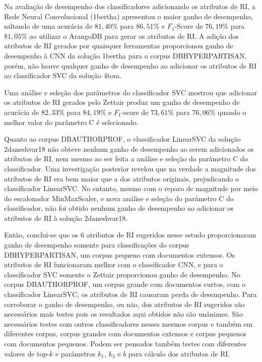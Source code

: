Na avaliação de desempenho dos classificadores adicionando os atributos de RI, a Rede Neural Convolucional (1\underscore{}bertha) apresentou o maior ganho de desempenho, saltando de uma acurácia de $81,40\%$ para $86,51\%$ e $F_1$-Score de $76,19\%$ para $81,05\%$ ao utilizar o ArangoDB para gerar os atributos de RI.
A adição dos atributos de RI gerados por quaisquer ferramentas proporcionou ganho de desempenho à CNN da solução 1\underscore{}bertha para o corpus DB\underscore{}HYPERPARTISAN, porém, não houve qualquer ganho de desempenho ao adicionar os atributos de RI ao classificador SVC da solução 4\underscore{}tom.

Uma análise e seleção dos parâmetros do classificador SVC mostrou que adicionar os atributos de RI gerados pelo Zettair produz um ganho de desempenho de acurácia de $82,33\%$ para $84,19\%$ e $F_1$-score de $73,61\%$ para $76,06\%$ quando o melhor valor do parâmetro C é selecionado.

Quanto ao corpus DB\underscore{}AUTHORPROF, o classificador LinearSVC da solução 2\underscore{}daneshvar18 não obteve nenhum ganho de desempenho ao serem adicionados os atributos de RI, nem mesmo ao ser feita a análise e seleção do parâmetro C do classificador.
Uma investigação posterior revelou que na verdade a magnitude dos atributos de RI era bem maior que a dos atributos originais, prejudicando o classificador LinearSVC.
No entanto, mesmo com o reparo de magnitude por meio do escalonador MinMaxScaler, e nova análise e seleção do parâmetro C do classificador, não foi obtido nenhum ganho de desempenho ao adicionar os atributos de RI à solução 2\underscore{}daneshvar18.

Então, conclui-se que os 6 atributos de RI sugeridos nesse estudo proporcionaram ganho de desempenho somente para classificações do corpus DB\underscore{}HYPERPARTISAN, um corpus pequeno com documentos extensos.
Os atributos de RI funcionaram melhor com o classificador CNN, e para o classificador SVC somente o Zettair proporcionou ganho de desempenho.
No corpus DB\underscore{}AUTHORPROF, um corpus grande com documentos curtos, com o classificador LinearSVC, os atributos de RI causaram perda de desempenho.
Para corroborar o ganho de desempenho, ou não, dos atributos de RI sugeridos são necessários mais testes pois os resultados aqui obtidos não são unânimes.
São necessários testes com outros classificadores nesses mesmos corpus e também em diferentes corpus, corpus grandes com documentos extensos e corpus pequenos com documentos pequenos. 
Podem ser pensados também testes com diferentes valores de top-$k$ e parâmetros $k_1$, $k_3$ e $b$ para cálculo dos atributos de RI.

